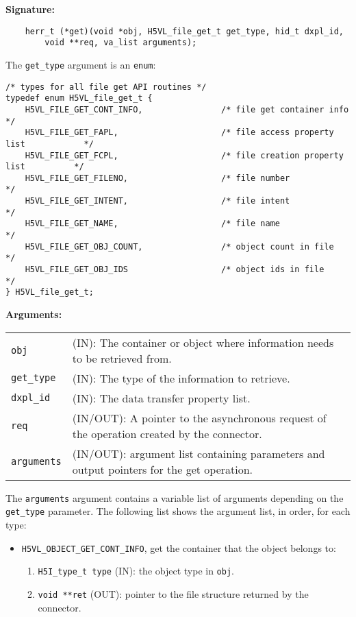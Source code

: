 \begin{mdframed}[style=bgbox] 
\textbf{Signature:}
\begin{lstlisting}
    herr_t (*get)(void *obj, H5VL_file_get_t get_type, hid_t dxpl_id, 
        void **req, va_list arguments);
\end{lstlisting}

The \texttt{get\_type} argument is an \texttt{enum}:
\begin{lstlisting}
/* types for all file get API routines */
typedef enum H5VL_file_get_t {                                                   
    H5VL_FILE_GET_CONT_INFO,                /* file get container info              */
    H5VL_FILE_GET_FAPL,                     /* file access property list            */
    H5VL_FILE_GET_FCPL,                     /* file creation property list          */
    H5VL_FILE_GET_FILENO,                   /* file number                          */
    H5VL_FILE_GET_INTENT,                   /* file intent                          */
    H5VL_FILE_GET_NAME,                     /* file name                            */
    H5VL_FILE_GET_OBJ_COUNT,                /* object count in file                 */
    H5VL_FILE_GET_OBJ_IDS                   /* object ids in file                   */
} H5VL_file_get_t; 
\end{lstlisting}

\textbf{Arguments:}\\
\begin{tabular}{l p{13.5cm}}
  \texttt{obj} & (IN): The container or object where information needs to be
  retrieved from.\\
  \texttt{get\_type} & (IN): The type of the information to retrieve.\\
  \texttt{dxpl\_id} & (IN): The data transfer property list.\\
  \texttt{req} & (IN/OUT): A pointer to the asynchronous request of the
  operation created by the connector.\\
  \texttt{arguments} & (IN/OUT): argument list containing parameters and
  output pointers for the get operation. \\
\end{tabular}

The \texttt{arguments} argument contains a variable list of arguments
depending on the \texttt{get\_type} parameter. The following list shows
the argument list, in order, for each type:

\begin{itemize}
\item \texttt{H5VL\_OBJECT\_GET\_CONT\_INFO}, get the container that the object
  belongs to:
  \begin{enumerate}
  \item \texttt{H5I\_type\_t type} (IN): the object type in \texttt{obj}.
  \item \texttt{void **ret} (OUT): pointer to the file structure returned
    by the connector.
  \end{enumerate}


\end{itemize}
\end{mdframed}
